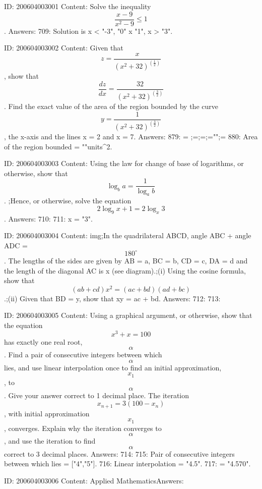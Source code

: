 \documentclass{article}
\begin{document}
ID: 200604003001
Content:
Solve the inequality  $$\frac{x - 9}{x^2  - 9} \le 1$$. Answers:
709: Solution is x < "-3", "0"  \leq  x  \leq "1", x > "3".

ID: 200604003002
Content:
Given that  $$z = \frac{x}{(x^2 + 32) ^\left(\frac{1}{2}\right)}$$, show that  $$\frac{dz}{dx} = \frac{32}{( x^2  + 32 )^\left(\frac{3}{2}\right)}$$. Find the exact value of the area of the region bounded by the curve  $$y = \frac{1}{( x^2  + 32 )^\left(\frac{3}{2}\right)}$$, the x-axis and the lines x = 2 and x = 7. Answers:
879:  =  ;=;=;="";=
880: Area of the region bounded = ""units^2.

ID: 200604003003
Content:
Using the law for change of base of logarithms, or otherwise, show that  $$\log _b a = \frac{1}{\log _a b}$$. ;Hence, or otherwise, solve the equation  $$2\log _9 x + 1 = 2\log _x 3$$. Answers:
710: 
711: x = "3".

ID: 200604003004
Content:
img;In the quadrilateral ABCD, angle ABC + angle ADC =  $$180^{\circ} $$. The lengths of the sides are given by AB = a, BC = b, CD = c, DA = d and the length of the diagonal AC is x (see diagram).;(i) Using the cosine formula, show that  $$( ab + cd )x^2  = ( ac + bd )( ad + bc )$$.;(ii) Given that BD = y, show that xy = ac + bd. Answers:
712: 
713: 

ID: 200604003005
Content:
Using a graphical argument, or otherwise, show that the equation  $$x^3  + x = 100$$ has exactly one real root,  $$\alpha $$. Find a pair of consecutive integers between which  $$\alpha $$ lies, and use linear interpolation once to find an initial approximation,  $$x_1 $$, to  $$\alpha $$. Give your answer correct to 1 decimal place. The iteration  $$x_{n + 1}  = 3 ( 100 - x_n ) $$, with initial approximation  $$x_1 $$, converges. Explain why the iteration converges to  $$\alpha $$, and use the iteration to find  $$\alpha $$ correct to 3 decimal places. Answers:
714: 
715: Pair of consecutive integers between which  \alpha  lies = ["4","5"].
716: Linear interpolation = "4.5".
717: \alpha = "4.570".

ID: 200604003006
Content:
Applied MathematicsAnswers:
\end{document}
